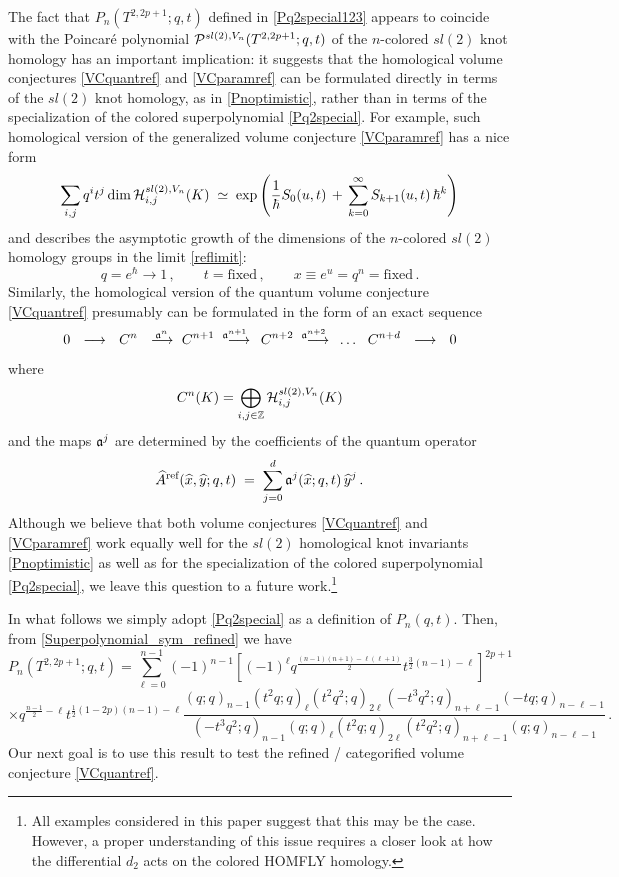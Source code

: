 \documentclass[hyper,letterpaper]{JHEP3}
\newcommand{\be}{\begin{equation}}
\newcommand{\ee}{\end{equation}}
\newcommand{\Z}{{\mathbb Z}}
\newcommand{\cH}{{\cal H }}
\renewcommand{\P}{{\cal P}}
\renewcommand{\hat}{\widehat}
\begin{document}
The fact that $P_{n}(T^{2,2p+1};q,t)$ defined in \eqref{Pq2special123}
appears to coincide with the Poincar\'e polynomial
$\P^{sl(2),V_n} (T^{2,2p+1}; q,t)$ of the $n$-colored $sl(2)$ knot homology has an important implication:
it suggests that the homological volume conjectures \eqref{VCquantref} and \eqref{VCparamref}
can be formulated directly in terms of the $sl(2)$ knot homology, as in \eqref{Pnoptimistic},
rather than in terms of the specialization of the colored superpolynomial \eqref{Pq2special}.
For example, such homological version of the generalized volume conjecture \eqref{VCparamref} has a nice form
\be
\sum_{i,j} q^i t^j \dim \cH^{sl(2),V_n}_{i,j} (K)
\; \simeq \;
\exp\left( \frac{1}{\hbar} S_0 (u,t) \,+\,\sum_{k=0}^\infty S_{k+1} (u,t) \, \hbar^{k} \right)
\ee
and describes the asymptotic growth of the dimensions of the $n$-colored $sl(2)$ homology groups in the limit \eqref{reflimit}:
\be
q = e^{\hbar} \to 1 \,, \qquad t = \text{fixed} \,, \qquad x \equiv e^u = q^n = \text{fixed} \,.
\ee
Similarly, the homological version of the quantum volume conjecture \eqref{VCquantref} presumably
can be formulated in the form of an exact sequence
\be
0~~
\longrightarrow~~ C^n~~
\longrightarrow^{\kern -13pt \frak{a}^{n}} ~~ C^{n+1}~~
\longrightarrow^{\kern -20pt \frak{a}^{n+1}}~~ C^{n+2}~~
\longrightarrow^{\kern -20pt \frak{a}^{n+2}}~~ \ldots ~~
C^{n+d}~~ \longrightarrow~~ 0
\label{VCsequence}
\ee
where
\be
C^n (K) = \bigoplus_{i,j \in \Z} \cH^{sl(2),V_n}_{i,j} (K)
\ee
and the maps $\frak{a}^j$ are determined by the coefficients of the quantum operator
\be
\hat A^{\text{ref}} (\hat x, \hat y; q, t) \; = \; \sum_{j=0}^d  \frak{a}^j (\hat x; q, t) \, \hat y^j \,.
\ee
Although we believe that both volume conjectures \eqref{VCquantref} and \eqref{VCparamref}
work equally well for the $sl(2)$ homological knot invariants \eqref{Pnoptimistic}
as well as for the specialization of the colored superpolynomial \eqref{Pq2special},
we leave this question to a future work.\footnote{All examples considered in this paper suggest that this may be the case.
However, a proper understanding of this issue requires a closer look at how the differential $d_2$ acts on the colored HOMFLY homology.}

In what follows we simply adopt \eqref{Pq2special} as a definition of $P_n (q,t)$.
Then, from \eqref{Superpolynomial_sym_refined} we have
$$
P_{n}(T^{2,2p+1};q,t) =
 \sum_{\ell=0}^{n-1}(-1)^{n-1}
\left[(-1)^{\ell}q^{\frac{(n-1)(n+1)-\ell(\ell+1)}{2}} t^{\frac{3}{2}(n-1)-\ell}\right]^{2p+1}
$$
\be
\times
q^{\frac{n-1}{2}-\ell}t^{\frac{1}{2}(1-2p)(n-1)-\ell}
\frac{(q;q)_{n-1}(t^2q;q)_{\ell}(t^2q^2;q)_{2\ell}(-t^3 q^2;q)_{n+\ell-1}(-tq;q)_{n-\ell-1}}
{(-t^3q^2;q)_{n-1}(q;q)_{\ell}(t^2q;q)_{2\ell}(t^2q^2;q)_{n+\ell-1}(q;q)_{n-\ell-1}} \,.
\label{refined_SU(2)}
\ee
Our next goal is to use this result to test the refined / categorified volume conjecture \eqref{VCquantref}.
\end{document}
